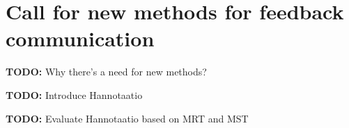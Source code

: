\documentclass[conference]{IEEEtran}
\begin{document}
\section{Call for new methods for feedback communication}

\textbf{TODO:} Why there's a need for new methods?

\textbf{TODO:} Introduce Hannotaatio

\textbf{TODO:} Evaluate Hannotaatio based on MRT and MST

%
%



%
%
\end{document}
